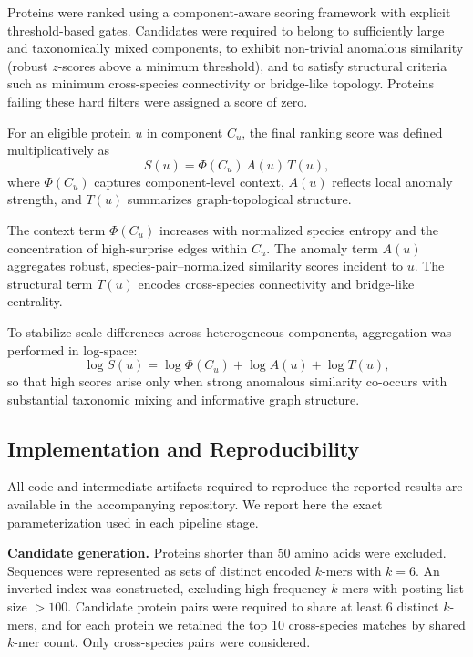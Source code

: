 \documentclass[11pt]{article}
\begin{document}
Proteins were ranked using a component-aware scoring framework with explicit threshold-based gates. 
Candidates were required to belong to sufficiently large and taxonomically mixed components, 
to exhibit non-trivial anomalous similarity (robust $z$-scores above a minimum threshold), 
and to satisfy structural criteria such as minimum cross-species connectivity or bridge-like topology. 
Proteins failing these hard filters were assigned a score of zero.

For an eligible protein $u$ in component $C_u$, the final ranking score was defined multiplicatively as
\begin{equation}
S(u) = \Phi(C_u)\, A(u)\, T(u),
\end{equation}
where $\Phi(C_u)$ captures component-level context, 
$A(u)$ reflects local anomaly strength, 
and $T(u)$ summarizes graph-topological structure.

The context term $\Phi(C_u)$ increases with normalized species entropy and the concentration of high-surprise edges within $C_u$. 
The anomaly term $A(u)$ aggregates robust, species-pair–normalized similarity scores incident to $u$. 
The structural term $T(u)$ encodes cross-species connectivity and bridge-like centrality.

To stabilize scale differences across heterogeneous components, aggregation was performed in log-space:
\begin{equation}
\log S(u) = \log \Phi(C_u) + \log A(u) + \log T(u),
\end{equation}
so that high scores arise only when strong anomalous similarity co-occurs with substantial taxonomic mixing and informative graph structure.

\subsection{Implementation and Reproducibility}

All code and intermediate artifacts required to reproduce the reported results are available in the accompanying repository. We report here the exact parameterization used in each pipeline stage.

\textbf{Candidate generation.}
Proteins shorter than 50 amino acids were excluded. Sequences were represented as sets of distinct encoded $k$-mers with $k=6$. An inverted index was constructed, excluding high-frequency $k$-mers with posting list size $>100$. Candidate protein pairs were required to share at least 6 distinct $k$-mers, and for each protein we retained the top 10 cross-species matches by shared $k$-mer count. Only cross-species pairs were considered.
\end{document}
